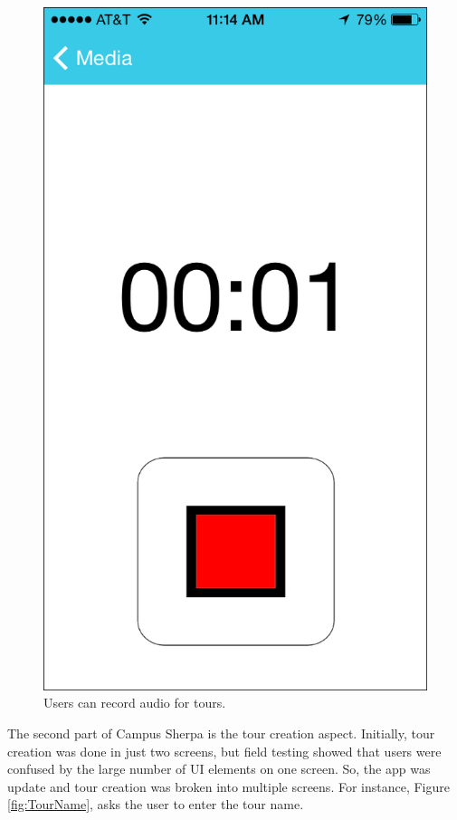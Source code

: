 \documentclass{sigchi}
\begin{document}
\begin{figure}
\centering
\includegraphics[width=0.7\linewidth]{./AudioRecord}
\caption{Users can record audio for tours.}
\label{fig:AudioRecord}
\end{figure}

The second part of Campus Sherpa is the tour creation aspect. Initially, tour creation was done in just two screens, but field testing showed that users were confused by the large number of UI elements on one screen. So, the app was update and tour creation was broken into multiple screens. For instance, Figure \ref{fig:TourName}, asks the user to enter the tour name.
\end{document}
